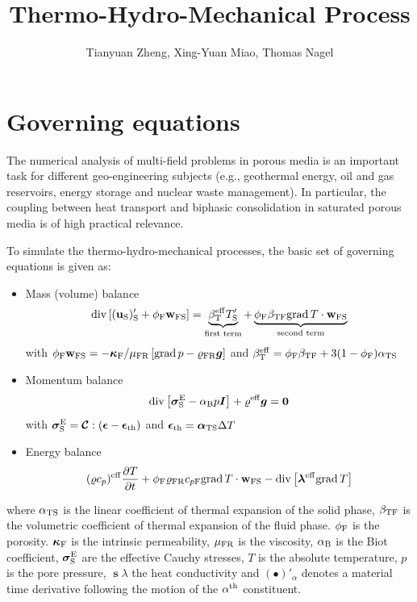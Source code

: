 \documentclass[a4paper,10pt]{article}
\title{Thermo-Hydro-Mechanical Process}
\author{Tianyuan Zheng, Xing-Yuan Miao, Thomas Nagel}
\begin{document}
\maketitle

\section{Governing equations}

The numerical analysis of multi-field problems in porous media is an important task for different geo-engineering subjects (e.g., geothermal energy, oil and gas reservoirs, energy storage and nuclear waste management). In particular, the coupling between heat transport and biphasic consolidation in saturated porous media is of high practical relevance. 

To simulate the thermo-hydro-mechanical processes, the basic set of governing equations is given as:
\begin{itemize}
\item Mass (volume) balance
\begin{equation}
\mathrm{div} \left[ (\boldsymbol{\mathrm{u}}_\mathrm{S})'_\mathrm{S} + \phi_\mathrm{F} \boldsymbol{\mathrm{w}}_\mathrm{FS} \right] = \underbrace{\beta^\mathrm{eff}_\mathrm{T} T'_\mathrm{S}}_{\text{first term}} + \underbrace{\phi_\mathrm{F} \beta_\mathrm{TF} \mathrm{grad}\, T \cdot \boldsymbol{\mathrm{w}}_\mathrm{FS}}_{\text{second term}}
\label{eq:mass_b_thm}
\end{equation}
with
$\phi_\mathrm{F} \boldsymbol{\mathrm{w}}_\mathrm{FS} = - \boldsymbol{\kappa}_\mathrm{F}/\mu_\mathrm{FR} \left[ \mathrm{grad}\, p - \varrho_\mathrm{FR} \boldsymbol{g} \right]$ and
$\beta^\mathrm{eff}_\mathrm{T} = \phi_\mathrm{F} \beta_\mathrm{TF} + 3 (1 - \phi_\mathrm{F}) \alpha_\mathrm{TS}$
\item Momentum balance
\begin{equation}
\mathrm{div} \left[ \boldsymbol{\sigma}^\mathrm{E}_\mathrm{S} - \alpha_\mathrm{B} p \boldsymbol{I} \right] + \varrho^\mathrm{eff} \boldsymbol{g} = \boldsymbol{0}
\label{eq:mom_b_thm}
\end{equation}
with
$\boldsymbol{\sigma}^\mathrm{E}_\mathrm{S} = \boldsymbol{\mathcal{C}} : (\boldsymbol{\epsilon} - \boldsymbol{\epsilon}_\mathrm{th})$ and $\boldsymbol{\epsilon}_\mathrm{th} = \boldsymbol{\alpha}_\mathrm{TS} \Delta T$
\item Energy balance
\begin{equation}
(\varrho c_p)^\mathrm{eff} \frac{\partial T}{\partial t} + \phi_\mathrm{F} \varrho_\mathrm{FR} c_{p\mathrm{F}} \mathrm{grad}\, T \cdot \boldsymbol{\mathrm{w}}_\mathrm{FS} - \mathrm{div} \left[ \boldsymbol{\lambda}^\mathrm{eff} \mathrm{grad}\, T \right]
\end{equation}
\end{itemize}
where $\alpha_\mathrm{TS}$ is the linear coefficient of thermal expansion of the solid phase, $\beta_\mathrm{TF}$ is the volumetric coefficient of thermal expansion of the fluid phase. $\phi_\mathrm{F}$ is the porosity. $\boldsymbol{\kappa}_\mathrm{F}$ is the intrinsic permeability, $\mu_\mathrm{FR}$ is the viscosity, $\alpha_\mathrm{B}$ is the Biot coefficient, $\boldsymbol{\sigma}^\mathrm{E}_\mathrm{S}$ are the effective Cauchy stresses, $T$ is the absolute temperature, $p$ is the pore pressure, $\mbfs{\lambda}$ the heat conductivity and $\left( \bullet \right)'_\alpha$ denotes a material time derivative following the motion of the $\alpha^\mathrm{th}$ constituent.
\end{document}
